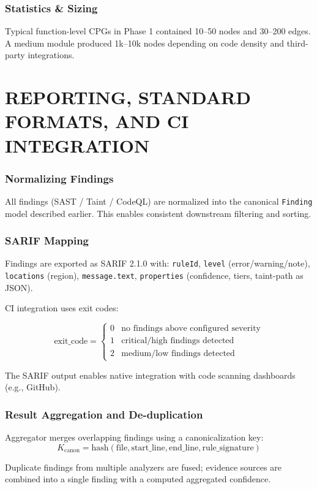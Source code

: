 \subsubsection{Statistics \& Sizing}

Typical function-level CPGs in Phase 1 contained 10--50 nodes and 30--200 edges. A medium module produced 1k--10k nodes depending on code density and third-party integrations.

\section{\uppercase{Reporting, Standard Formats, and CI Integration}}

\subsubsection{Normalizing Findings}

All findings (SAST / Taint / CodeQL) are normalized into the canonical \texttt{Finding} model described earlier. This enables consistent downstream filtering and sorting.

\subsubsection{SARIF Mapping}

Findings are exported as SARIF 2.1.0 with:
\texttt{ruleId}, \texttt{level} (error/warning/note), \texttt{locations} (region), \texttt{message.text}, \texttt{properties} (confidence, tiers, taint-path as JSON).

CI integration uses exit codes:

\begin{equation}
\text{exit\_code} = \begin{cases}
0 & \text{no findings above configured severity} \\
1 & \text{critical/high findings detected} \\
2 & \text{medium/low findings detected}
\end{cases}
\label{eq:exit_codes}
\end{equation}

The SARIF output enables native integration with code scanning dashboards (e.g., GitHub).

\subsubsection{Result Aggregation and De-duplication}

Aggregator merges overlapping findings using a canonicalization key:
\begin{equation}
K_{\text{canon}} = \text{hash}(\text{file}, \text{start\_line}, \text{end\_line}, \text{rule\_signature})
\label{eq:dedup_key}
\end{equation}

Duplicate findings from multiple analyzers are fused; evidence sources are combined into a single finding with a computed aggregated confidence.
